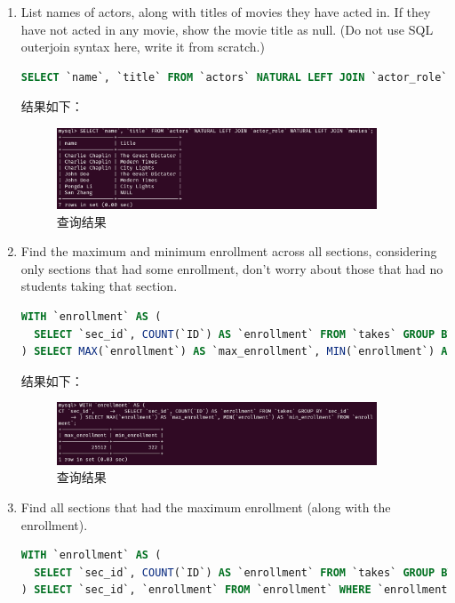 \documentclass{article}
\begin{document}
\begin{enumerate}
\item List names of actors, along with titles of movies they have acted in. If they have not acted in any movie, show the movie title as null. (Do not use SQL outerjoin syntax here, write it from scratch.)

\begin{lstlisting}[language=sql]
SELECT `name`, `title` FROM `actors` NATURAL LEFT JOIN `actor_role` NATURAL LEFT JOIN `movies`;
\end{lstlisting}

结果如下：

\begin{figure}[H]
\centering
\includegraphics[width=0.9\textwidth]{img/19.png}
\caption{查询结果}
\end{figure}

\item Find the maximum and minimum enrollment across all sections, considering only sections that had some enrollment, don’t worry about those that had no students taking that section.

\begin{lstlisting}[language=sql]
WITH `enrollment` AS (
  SELECT `sec_id`, COUNT(`ID`) AS `enrollment` FROM `takes` GROUP BY `sec_id`
) SELECT MAX(`enrollment`) AS `max_enrollment`, MIN(`enrollment`) AS `min_enrollment` FROM `enrollment`;
\end{lstlisting}

结果如下：

\begin{figure}[H]
\centering
\includegraphics[width=0.9\textwidth]{img/20.png}
\caption{查询结果}
\end{figure}

\item Find all sections that had the maximum enrollment (along with the enrollment).

\begin{lstlisting}[language=sql]
WITH `enrollment` AS (
  SELECT `sec_id`, COUNT(`ID`) AS `enrollment` FROM `takes` GROUP BY `sec_id`
) SELECT `sec_id`, `enrollment` FROM `enrollment` WHERE `enrollment` = (SELECT MAX(`enrollment`) FROM `enrollment`);
\end{lstlisting}


\end{enumerate}
\end{document}
